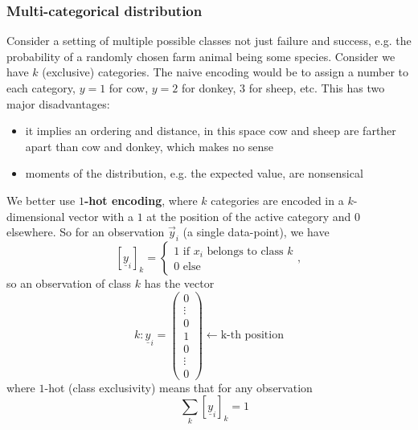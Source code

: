\subsubsection{Multi-categorical distribution}
Consider a setting of multiple possible classes not just failure and success, e.g.
the probability of a randomly chosen farm animal being some species.
Consider we have $k$ (exclusive) categories. The naive encoding would be to assign a number to each category,
$y = 1$ for cow, $y = 2$ for donkey, $3$ for sheep, etc. This has two major disadvantages:
\begin{itemize}
    \item it implies an ordering and distance, in this space cow and sheep are farther apart than cow and donkey, which makes no sense
    \item moments of the distribution, e.g. the expected value, are nonsensical
\end{itemize}
We better use \textbf{$1$-hot encoding}, where $k$ categories are encoded in a $k$-dimensional vector with a $1$ at the position of the active 
category and $0$ elsewhere. So for an observation $\vec{y}_i$ (a single data-point), we have
\begin{equation}
    \left[\underline{y}_i\right]_k=\left\{\begin{array}{c}
        1 \text { if } x_i \text { belongs to class } k \\
        0 \text { else }
        \end{array},\right.
\end{equation}
so an observation of class $k$ has the vector
\begin{equation}
    k: \underline{y}_i=\left(\begin{array}{c}0 \\ \vdots \\ 0 \\ 1 \\ 0 \\ \vdots \\ 0\end{array}\right) \leftarrow \text{k-th position}
\end{equation}
where $1$-hot (class exclusivity) means that for any observation
\begin{equation}
    \quad \sum_k\left[\underline{y}_i\right]_k=1
\end{equation}

